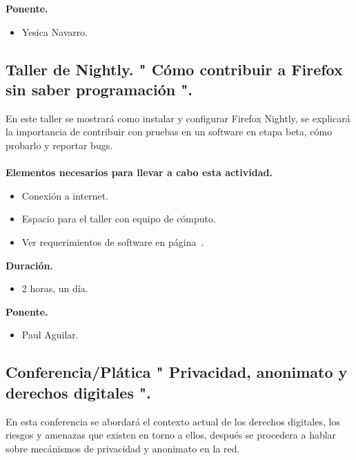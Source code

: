 \documentclass[a4paper,11pt]{article}                 %
\begin{document}
              \textbf{Ponente.}
  \begin{itemize}
    \item Yesica Navarro.
  \end{itemize}
  
  
                \subsection{Taller de Nightly. " {Cómo} contribuir a Firefox sin saber programación ".}                                     %

   En este taller se mostrará como instalar y configurar Firefox Nightly, se explicará la importancia de contribuir con pruebas en un software en etapa beta, cómo probarlo y reportar bugs. 
      \paragraph{}
  \textbf{Elementos necesarios para llevar a cabo esta actividad.}
  \begin{itemize}
    \label{list:nightly}
    \item Conexión a internet.
    \item Espacio para el taller con equipo de cómputo.
    \item Ver requerimientos de software en página~\pageref{list:nightlys}.
  \end{itemize}
  
  \textbf{Duración.}
  \begin{itemize}
    \item 2 horas, un día.
  \end{itemize}
  
              \textbf{Ponente.}
  \begin{itemize}
    \item Paul Aguilar.
  \end{itemize}
  
  \vspace{1 cm}
  
            \subsection{Conferencia/Plática " Privacidad, anonimato y derechos digitales ".}                                     %

   En esta conferencia se abordará el contexto actual de los derechos digitales, los riesgos y amenazas que existen en torno a ellos, después se procedera a hablar sobre mecánismos de privacidad y anonimato en la red.
\end{document}
